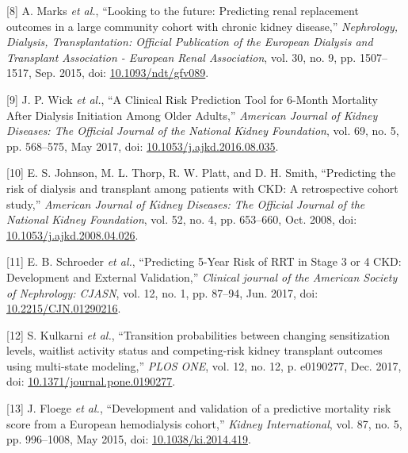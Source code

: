 \documentclass[12pt,twoside]{reedthesis}
\newenvironment{cslreferences}%
  {}%
  {\par}
\begin{document}
\begin{cslreferences}
\leavevmode\hypertarget{ref-marks_looking_2015}{}%
{[}8{]} A. Marks \emph{et al.}, ``Looking to the future: Predicting renal replacement outcomes in a large community cohort with chronic kidney disease,'' \emph{Nephrology, Dialysis, Transplantation: Official Publication of the European Dialysis and Transplant Association - European Renal Association}, vol. 30, no. 9, pp. 1507--1517, Sep. 2015, doi: \href{https://doi.org/10.1093/ndt/gfv089}{10.1093/ndt/gfv089}.

\leavevmode\hypertarget{ref-wick_clinical_2017}{}%
{[}9{]} J. P. Wick \emph{et al.}, ``A Clinical Risk Prediction Tool for 6-Month Mortality After Dialysis Initiation Among Older Adults,'' \emph{American Journal of Kidney Diseases: The Official Journal of the National Kidney Foundation}, vol. 69, no. 5, pp. 568--575, May 2017, doi: \href{https://doi.org/10.1053/j.ajkd.2016.08.035}{10.1053/j.ajkd.2016.08.035}.

\leavevmode\hypertarget{ref-johnson_predicting_2008}{}%
{[}10{]} E. S. Johnson, M. L. Thorp, R. W. Platt, and D. H. Smith, ``Predicting the risk of dialysis and transplant among patients with CKD: A retrospective cohort study,'' \emph{American Journal of Kidney Diseases: The Official Journal of the National Kidney Foundation}, vol. 52, no. 4, pp. 653--660, Oct. 2008, doi: \href{https://doi.org/10.1053/j.ajkd.2008.04.026}{10.1053/j.ajkd.2008.04.026}.

\leavevmode\hypertarget{ref-schroeder_predicting_2017}{}%
{[}11{]} E. B. Schroeder \emph{et al.}, ``Predicting 5-Year Risk of RRT in Stage 3 or 4 CKD: Development and External Validation,'' \emph{Clinical journal of the American Society of Nephrology: CJASN}, vol. 12, no. 1, pp. 87--94, Jun. 2017, doi: \href{https://doi.org/10.2215/CJN.01290216}{10.2215/CJN.01290216}.

\leavevmode\hypertarget{ref-kulkarni_transition_2017}{}%
{[}12{]} S. Kulkarni \emph{et al.}, ``Transition probabilities between changing sensitization levels, waitlist activity status and competing-risk kidney transplant outcomes using multi-state modeling,'' \emph{PLOS ONE}, vol. 12, no. 12, p. e0190277, Dec. 2017, doi: \href{https://doi.org/10.1371/journal.pone.0190277}{10.1371/journal.pone.0190277}.

\leavevmode\hypertarget{ref-floege_development_2015-1}{}%
{[}13{]} J. Floege \emph{et al.}, ``Development and validation of a predictive mortality risk score from a European hemodialysis cohort,'' \emph{Kidney International}, vol. 87, no. 5, pp. 996--1008, May 2015, doi: \href{https://doi.org/10.1038/ki.2014.419}{10.1038/ki.2014.419}.


\end{cslreferences}
\end{document}
